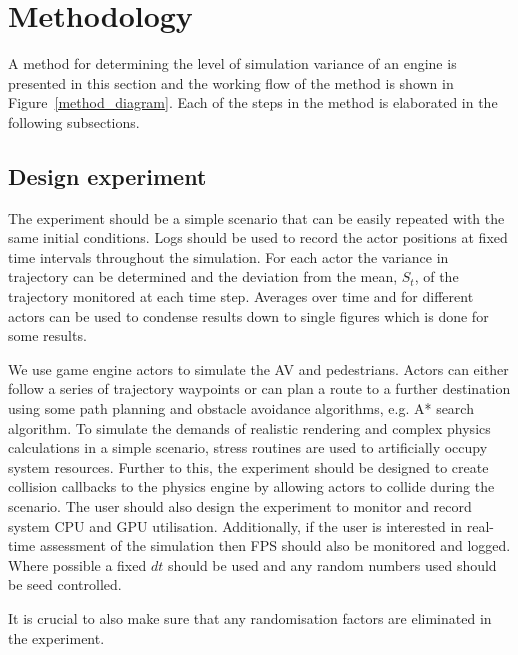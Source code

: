\section{Methodology} \label{method}
\noindent A method for determining the level of simulation variance of an engine is presented in this section and the working flow of the method is shown in Figure~\ref{method_diagram}. Each of the steps in the method is elaborated in the following subsections.

\subsection{Design experiment}
The experiment should be a simple scenario that can be easily repeated with the same initial conditions. Logs should be used to record the actor positions at fixed time intervals throughout the simulation. For each actor the variance in trajectory can be determined and the deviation from the mean, $S_t$, of the trajectory monitored at each time step. Averages over time and for different actors can be used to condense results down to single figures which is done for some results.

We use game engine actors to simulate the AV and pedestrians. Actors can either follow a series of trajectory waypoints or can plan a route to a further destination using some path planning and obstacle avoidance algorithms, e.g. A* search algorithm. 
% 
To simulate the demands of realistic rendering and complex physics calculations in a simple scenario, stress routines are used to artificially occupy system resources. 
Further to this, the experiment should be designed to create collision callbacks to the physics engine by allowing actors to collide during the scenario. 
%
The user should also design the experiment to monitor and record system CPU and GPU utilisation. Additionally, if the user is interested in real-time assessment of the simulation then FPS should also be monitored and logged.
%
Where possible a fixed $dt$ should be used and any random numbers used should be seed controlled.



It is crucial to also make sure that any randomisation factors are eliminated in the experiment.

